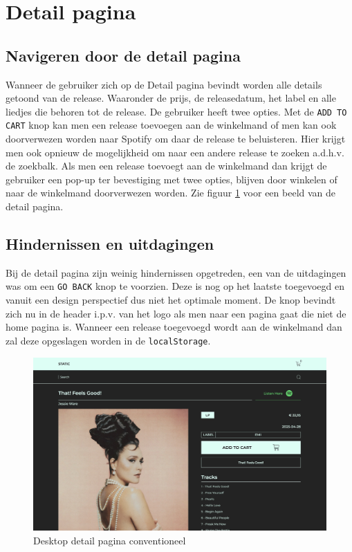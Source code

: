 \newpage

\section{Detail pagina}

\subsection{Navigeren door de detail pagina}

Wanneer de gebruiker zich op de Detail pagina bevindt worden alle details getoond van de release. Waaronder de prijs, de releasedatum, het label en alle liedjes die behoren tot de release. De gebruiker heeft twee opties. Met de \texttt{ADD TO CART} knop kan men een release toevoegen aan de winkelmand of men kan ook doorverwezen worden naar Spotify om daar de release te beluisteren. Hier krijgt men ook opnieuw de mogelijkheid om naar een andere release te zoeken a.d.h.v. de zoekbalk. Als men een release toevoegt aan de winkelmand dan krijgt de gebruiker een pop-up ter bevestiging met twee opties, blijven door winkelen of naar de winkelmand doorverwezen worden. Zie figuur \ref{fig:desktopDetailConventioneel} voor een beeld van de detail pagina.

\subsection{Hindernissen en uitdagingen}

Bij de detail pagina zijn weinig hindernissen opgetreden, een van de uitdagingen was om een \texttt{GO BACK} knop te voorzien. Deze is nog op het laatste toegevoegd en vanuit een design perspectief dus niet het optimale moment. De knop bevindt zich nu in de header i.p.v. van het logo als men naar een pagina gaat die niet de home pagina is. Wanneer een release toegevoegd wordt aan de winkelmand dan zal deze opgeslagen worden in de \texttt{localStorage}.

\begin{figure}
	\centering
	\includegraphics[width=1\linewidth]{graphics/desktopDetailConventioneel}
	\caption[Desktop detail pagina conventioneel]{Desktop detail pagina conventioneel}
	\label{fig:desktopDetailConventioneel}
\end{figure}

